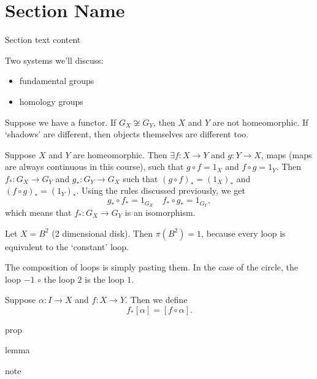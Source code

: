 \setcounter{section}{0}
\section{Section Name}
Section text content

Two systems we'll discuss:
\begin{itemize}
    \item fundamental groups
    \item homology groups
\end{itemize}


\begin{eg}
    Suppose we have a functor.
    If $G_X \not\cong G_Y$, then  $X$ and  $Y$ are not homeomorphic.
    If `shadows' are different, then objects themselves are different too.
\end{eg}
\begin{explanation}
    Suppose $X$ and $Y$ are homeomorphic.
    Then $\exists f: X \to  Y$ and $g: Y \to  X$, maps (maps are always continuous in this course), such that $g  \circ f = 1_X$ and $f \circ g = 1_Y$.
    Then $f_*: G_X \to G_Y$ and $g_*: G_Y \to  G_X$ such that $(g \circ f)_* = (1_X)_*$ and  $(f \circ g)_* = (1_Y)_*$. Using the rules discussed previously, we get
    \[
    g_*  \circ f_* = 1_{G_X} \quad f_*  \circ  g_* = 1_{G_Y}
    ,\] 
    which means that $f_* : G_X \to  G_Y$ is an isomorphism.
\end{explanation}

\begin{eg}
    Let $X = B^2$ (2 dimensional disk).
    Then $\pi(B^2) = 1$, because every loop is equivalent to the `constant' loop.
\end{eg}

The composition of loops is simply pasting them.
In the case of the circle, the loop $-1$  $\circ$ the loop  $2$ is the loop $1$.

Suppose $\alpha: I \to  X$ and $f : X\to Y$. Then we define 
\[
    f_*[\alpha] = [f \circ \alpha]
.\] 

\begin{prop}
    prop
\end{prop}
\begin{lemma}
    lemma
\end{lemma}
\begin{note}
    note
\end{note}

